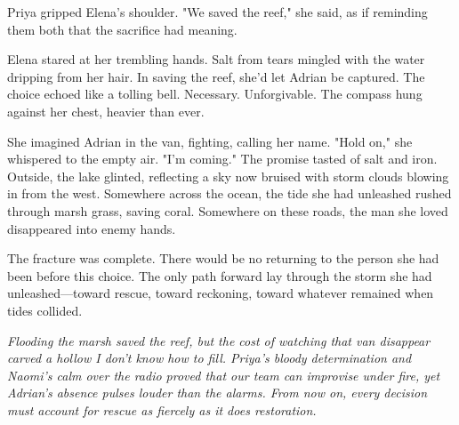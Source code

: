 Priya gripped Elena's shoulder. "We saved the reef," she said, as if reminding them both that the sacrifice had meaning.

Elena stared at her trembling hands. Salt from tears mingled with the water dripping from her hair. In saving the reef, she'd let Adrian be captured. The choice echoed like a tolling bell. Necessary. Unforgivable. The compass hung against her chest, heavier than ever.

She imagined Adrian in the van, fighting, calling her name. "Hold on," she whispered to the empty air. "I'm coming." The promise tasted of salt and iron. Outside, the lake glinted, reflecting a sky now bruised with storm clouds blowing in from the west. Somewhere across the ocean, the tide she had unleashed rushed through marsh grass, saving coral. Somewhere on these roads, the man she loved disappeared into enemy hands.

The fracture was complete. There would be no returning to the person she had been before this choice. The only path forward lay through the storm she had unleashed—toward rescue, toward reckoning, toward whatever remained when tides collided.


\noindent\textit{Flooding the marsh saved the reef, but the cost of watching that van disappear carved a hollow I don't know how to fill. Priya's bloody determination and Naomi's calm over the radio proved that our team can improvise under fire, yet Adrian's absence pulses louder than the alarms. From now on, every decision must account for rescue as fiercely as it does restoration.}
